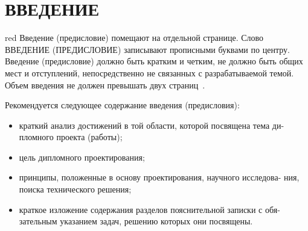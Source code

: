 \section*{ВВЕДЕНИЕ}

\begin{color}{red}
  Введение (предисловие) помещают на отдельной странице. Слово
  ВВЕДЕНИЕ (ПРЕДИСЛОВИЕ) записывают прописными буквами по центру.
  Введение (предисловие) должно быть кратким и четким, не должно быть общих
  мест и отступлений, непосредственно не связанных с разрабатываемой темой.
  Объем введения не должен превышать двух страниц~\cite{stp2013}.

  Рекомендуется следующее содержание введения (предисловия):
  \begin{itemize}
  \item краткий анализ достижений в той области, которой посвящена тема ди-
    пломного проекта (работы);
  \item цель дипломного проектирования;
  \item принципы, положенные в основу проектирования, научного исследова-
    ния, поиска технического решения;
  \item краткое изложение содержания разделов пояснительной записки с обя-
    зательным указанием задач, решению которых они посвящены.
  \end{itemize}
\end{color}